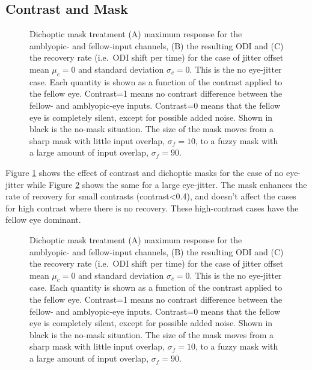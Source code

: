 \documentclass[
  sn-apa,
  pdflatex]{sn-jnl}
\theoremstyle{thmstyleone}%
\theoremstyle{thmstyletwo}%
\theoremstyle{thmstylethree}%
\begin{document}
\hypertarget{contrast-and-mask}{%
\subsection{Contrast and Mask}\label{contrast-and-mask}}

\begin{figure}
\hypertarget{fig:mask-response-ODI-contrast-mu0-sigma0}{%
\centering

\caption{Dichoptic mask treatment (A) maximum response for the
amblyopic- and fellow-input channels, (B) the resulting ODI and (C) the
recovery rate (i.e.~ODI shift per time) for the case of jitter offset
mean \(\mu_c=0\) and standard deviation \(\sigma_c=0\). This is the no
eye-jitter case. Each quantity is shown as a function of the contrast
applied to the fellow eye. Contrast=1 means no contrast difference
between the fellow- and amblyopic-eye inputs. Contrast=0 means that the
fellow eye is completely silent, except for possible added noise. Shown
in black is the no-mask situation. The size of the mask moves from a
sharp mask with little input overlap, \(\sigma_f=10\), to a fuzzy mask
with a large amount of input overlap,
\(\sigma_f=90\).}\label{fig:mask-response-ODI-contrast-mu0-sigma0}
}
\end{figure}

Figure \ref{fig:mask-response-ODI-contrast-mu0-sigma0} shows the effect
of contrast and dichoptic masks for the case of no eye-jitter while
Figure \ref{fig:mask-response-ODI-contrast-mu75-sigma2} shows the same
for a large eye-jitter. The mask enhances the rate of recovery for small
contrasts (contrast\textless0.4), and doesn't affect the cases for high
contrast where there is no recovery. These high-contrast cases have the
fellow eye dominant.

\begin{figure}
\hypertarget{fig:mask-response-ODI-contrast-mu75-sigma2}{%
\centering

\caption{Dichoptic mask treatment (A) maximum response for the
amblyopic- and fellow-input channels, (B) the resulting ODI and (C) the
recovery rate (i.e.~ODI shift per time) for the case of jitter offset
mean \(\mu_c=0\) and standard deviation \(\sigma_c=0\). This is the no
eye-jitter case. Each quantity is shown as a function of the contrast
applied to the fellow eye. Contrast=1 means no contrast difference
between the fellow- and amblyopic-eye inputs. Contrast=0 means that the
fellow eye is completely silent, except for possible added noise. Shown
in black is the no-mask situation. The size of the mask moves from a
sharp mask with little input overlap, \(\sigma_f=10\), to a fuzzy mask
with a large amount of input overlap,
\(\sigma_f=90\).}\label{fig:mask-response-ODI-contrast-mu75-sigma2}
}
\end{figure}
\end{document}
